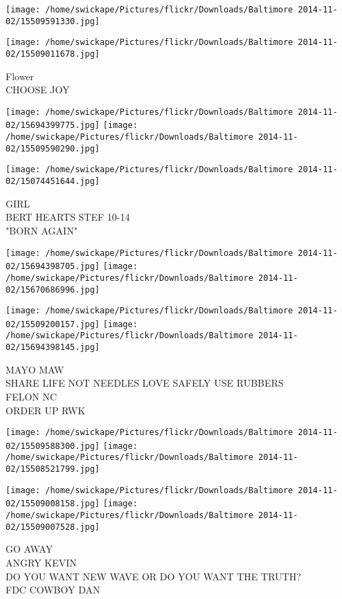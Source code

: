 \documentclass[10pt,letterpaper]{article}
\begin{document}
\texttt{[image: /home/swickape/Pictures/flickr/Downloads/Baltimore 2014-11-02/15509591330.jpg]}

\vspace{0.25in}
\texttt{[image: /home/swickape/Pictures/flickr/Downloads/Baltimore 2014-11-02/15509011678.jpg]}

Flower\\
CHOOSE JOY
\pagebreak

\texttt{[image: /home/swickape/Pictures/flickr/Downloads/Baltimore 2014-11-02/15694399775.jpg]}
\texttt{[image: /home/swickape/Pictures/flickr/Downloads/Baltimore 2014-11-02/15509590290.jpg]}

\vspace{0.25in}
\texttt{[image: /home/swickape/Pictures/flickr/Downloads/Baltimore 2014-11-02/15074451644.jpg]}

GIRL\\
BERT HEARTS STEF 10{-}14\\
"BORN AGAIN"
\pagebreak

\texttt{[image: /home/swickape/Pictures/flickr/Downloads/Baltimore 2014-11-02/15694398705.jpg]}
\texttt{[image: /home/swickape/Pictures/flickr/Downloads/Baltimore 2014-11-02/15670686996.jpg]}

\texttt{[image: /home/swickape/Pictures/flickr/Downloads/Baltimore 2014-11-02/15509200157.jpg]}
\texttt{[image: /home/swickape/Pictures/flickr/Downloads/Baltimore 2014-11-02/15694398145.jpg]}

MAYO MAW\\
SHARE LIFE NOT NEEDLES LOVE SAFELY USE RUBBERS\\
FELON NC\\
ORDER UP RWK
\pagebreak

\texttt{[image: /home/swickape/Pictures/flickr/Downloads/Baltimore 2014-11-02/15509588300.jpg]}
\texttt{[image: /home/swickape/Pictures/flickr/Downloads/Baltimore 2014-11-02/15508521799.jpg]}

\texttt{[image: /home/swickape/Pictures/flickr/Downloads/Baltimore 2014-11-02/15509008158.jpg]}
\texttt{[image: /home/swickape/Pictures/flickr/Downloads/Baltimore 2014-11-02/15509007528.jpg]}

GO AWAY\\
ANGRY KEVIN\\
DO YOU WANT NEW WAVE OR DO YOU WANT THE TRUTH?\\
FDC COWBOY DAN
\pagebreak
\end{document}
